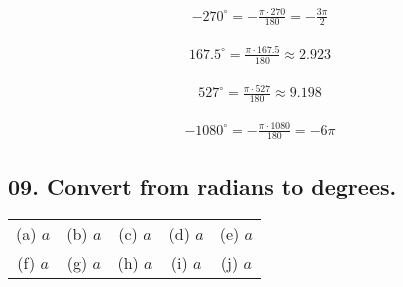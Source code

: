 \documentclass[12pt, a4paper]{article}
\begin{document}
\begin{align}
	\tag{g}
	-270^\circ = -\frac{\pi\cdot270}{180} = -\frac{3\pi}{2}
\end{align}

\begin{align}
	\tag{h}
	167.5^\circ = \frac{\pi\cdot167.5}{180} \approx 2.923
\end{align}

\begin{align}
	\tag{i}
	527^\circ=\frac{\pi\cdot527}{180} \approx 9.198
\end{align}

\begin{align}
	\tag{j}
	-1080^\circ=-\frac{\pi\cdot1080}{180}=-6\pi
\end{align}

\newpage\quad
\subsection*{09. Convert from radians to degrees.}

\begin{center}
\begin{tabular}{ c c c c c }
 (a) $a$ & (b) $a$ & (c) $a$
 & (d) $a$ & (e) $a$ \\  
 
 (f) $a$ & (g) $a$ & (h) $a$
 & (i) $a$ & (j) $a$  
\end{tabular}
\end{center}
\end{document}
